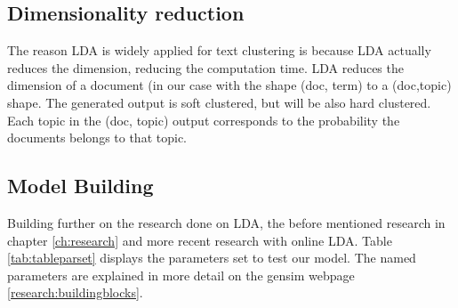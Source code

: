 \subsection{Dimensionality reduction} \label{methodology:dimreduction}
The reason LDA is widely applied for text clustering is because LDA actually reduces the dimension, reducing the computation time. LDA reduces the dimension of a document (in our case with the shape (doc, term) to a (doc,topic) shape. The generated output is soft clustered, but will be also hard clustered. Each topic in the (doc, topic) output corresponds to the probability the documents belongs to that topic.

\subsection{Model Building} \label{methodology:model_building}
Building further on the research done on LDA, the before mentioned research in chapter \ref{ch:research} and more recent research with online LDA. Table \ref{tab:tableparset} displays the parameters set to test our model. The named parameters are explained in more detail on the gensim webpage \ref{research:buildingblocks}. 

